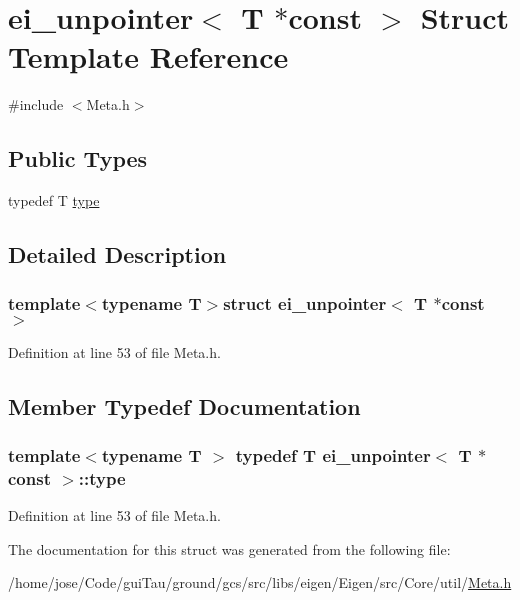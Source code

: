 \hypertarget{structei__unpointer_3_01_t_01_5const_01_01_4}{\section{ei\-\_\-unpointer$<$ T $\ast$const $>$ Struct Template Reference}
\label{structei__unpointer_3_01_t_01_5const_01_01_4}
}


{\ttfamily \#include $<$Meta.\-h$>$}

\subsection*{Public Types}
\begin{DoxyCompactItemize}
\item 
typedef T \hyperlink{structei__unpointer_3_01_t_01_5const_01_01_4_a4946f6d0b1f6681c2203dcbd7946b410}{type}
\end{DoxyCompactItemize}


\subsection{Detailed Description}
\subsubsection*{template$<$typename T$>$struct ei\-\_\-unpointer$<$ T $\ast$const  $>$}



Definition at line 53 of file Meta.\-h.



\subsection{Member Typedef Documentation}
\hypertarget{structei__unpointer_3_01_t_01_5const_01_01_4_a4946f6d0b1f6681c2203dcbd7946b410}{
\subsubsection[{type}]{\setlength{\rightskip}{0pt plus 5cm}template$<$typename T $>$ typedef T {\bf ei\-\_\-unpointer}$<$ T $\ast$const  $>$\-::{\bf type}}}\label{structei__unpointer_3_01_t_01_5const_01_01_4_a4946f6d0b1f6681c2203dcbd7946b410}


Definition at line 53 of file Meta.\-h.



The documentation for this struct was generated from the following file\-:\begin{DoxyCompactItemize}
\item 
/home/jose/\-Code/gui\-Tau/ground/gcs/src/libs/eigen/\-Eigen/src/\-Core/util/\hyperlink{_meta_8h}{Meta.\-h}\end{DoxyCompactItemize}
